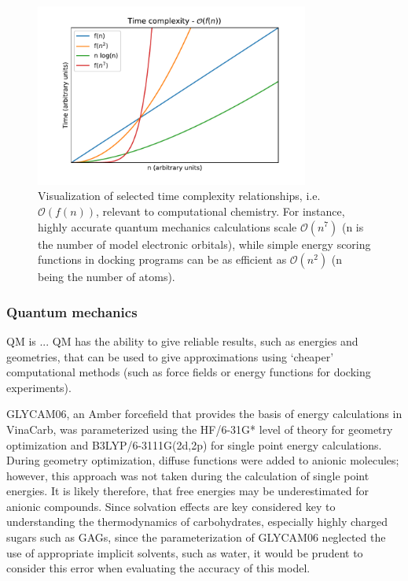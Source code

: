 \documentclass[journal=jctcce,manuscript=article]{achemso}
\begin{document}
{\begin{figure}[tl!]
    \centering
    \includegraphics[width=9cm]{timecomplexity.pdf}
    \caption{Visualization of selected time complexity relationships, i.e. $\mathcal{O}(f(n))$, relevant to computational chemistry. For instance, highly accurate quantum mechanics calculations scale $\mathcal{O}(n^{7})$ (n is the number of model electronic orbitals), while simple energy scoring functions in docking programs can be as efficient as $\mathcal{O}(n^{2})$ (n being the number of atoms).}
    \label{fig:timecomplexity}
\end{figure}

\subsubsection{Quantum mechanics}
\Ac{QM} is ...
\Ac{QM} has the ability to give reliable results, such as energies and geometries, that can be used to give approximations using `cheaper' computational methods (such as force fields or energy functions for docking experiments). 

GLYCAM06, an Amber forcefield that provides the basis of energy calculations in VinaCarb, was parameterized using the HF/6-31G* level of theory for geometry optimization and B3LYP/6-3111G(2d,2p) for single point energy calculations\cite{Kirschner2008GLYCAM06:Carbohydrates}. 
During geometry optimization, diffuse functions were added to anionic molecules; however, this approach was not taken during the calculation of single point energies. It is likely therefore, that free energies may be underestimated for anionic compounds. Since solvation effects are key considered key to understanding the thermodynamics of carbohydrates, especially highly charged sugars such as \acp{GAG}, since the parameterization of GLYCAM06 neglected the use of appropriate implicit solvents, such as water, it would be prudent to consider this error when evaluating the accuracy of this model. 

}
\end{document}
